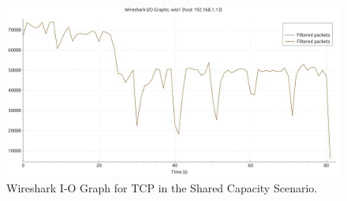 \begin{enumerate}




                \begin{figure}[ht]
                    \centering
                    \includegraphics[width=0.9\columnwidth]{images/graphs/I-O/I-O_MIX_MITM_TCP.pdf}
                    \caption{Wireshark I-O Graph for TCP in the Shared Capacity Scenario.}
                    \label{fig:io-mitm-tcp}
                \end{figure}

        \end{enumerate}


